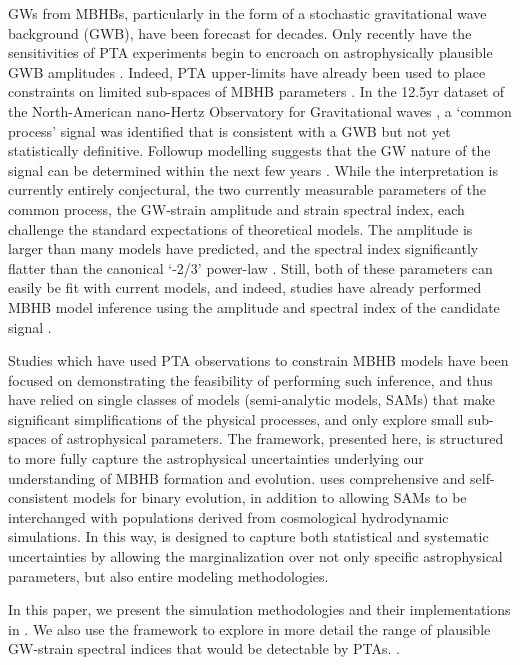 \documentclass[useAMS, usenatbib]{mnras}
\begin{document}
    GWs from MBHBs, particularly in the form of a stochastic gravitational wave background (GWB), have been forecast for decades.  Only recently have the sensitivities of PTA experiments begin to encroach on astrophysically plausible GWB amplitudes  .  Indeed, PTA upper-limits have already been used to place constraints on limited sub-spaces of MBHB parameters .  In the 12.5yr dataset of the North-American nano-Hertz Observatory for Gravitational waves , a `common process' signal was identified that is consistent with a GWB but not yet statistically definitive.  Followup modelling suggests that the GW nature of the signal can be determined within the next few years .  While the interpretation is currently entirely conjectural, the two currently measurable parameters of the common process, the GW-strain amplitude and strain spectral index, each challenge the standard expectations of theoretical models.  The  amplitude is larger than many models have predicted, and the spectral index significantly flatter than the canonical `-2/3' power-law  .  Still, both of these parameters can easily be fit with current models, and indeed, studies have already performed MBHB model inference using the amplitude and spectral index of the candidate  signal .

    Studies which have used PTA observations to constrain MBHB models have been focused on demonstrating the feasibility of performing such inference, and thus have relied on single classes of models (semi-analytic models, SAMs) that make significant simplifications of the physical processes, and only explore small sub-spaces of astrophysical parameters.  The \holodeck{} framework, presented here, is structured to more fully capture the astrophysical uncertainties underlying our understanding of MBHB formation and evolution.  \holodeck{} uses comprehensive and self-consistent models for binary evolution, in addition to allowing SAMs to be interchanged with populations derived from cosmological hydrodynamic simulations.  In this way, \holodeck{} is designed to capture both statistical and systematic uncertainties by allowing the marginalization over not only specific astrophysical parameters, but also entire modeling methodologies.

    In this paper, we present the simulation methodologies and their implementations in \holodeck{}.  We also use the framework to explore in more detail the range of plausible GW-strain spectral indices that would be detectable by PTAs. .
\end{document}
